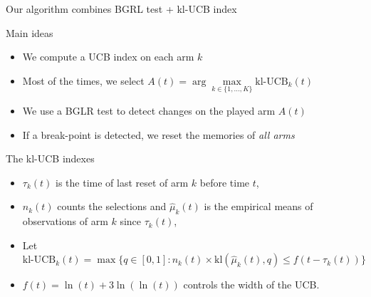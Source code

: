 \documentclass[11pt,french,ignorenonframetext,]{beamer}
\begin{document}
\begin{frame}{Our algorithm combines BGRL test + kl-UCB index}

  \begin{block}{Main ideas}
    \begin{itemize}
      \item We compute a UCB index on each arm $k$
      \item Most of the times, we select
      $A(t) = \arg\max\limits_{k\in \{1,\dots,K\}} \mbox{kl-UCB}_k(t)$
      \item We use a BGLR test \alert{to detect changes on the played arm $A(t)$}
      \item If a break-point is detected, \alert{we reset the memories of \emph{all arms}}
    \end{itemize}
  \end{block}

  \pause

  \begin{exampleblock}{The kl-UCB indexes}
    \begin{itemize}
      \item $\tau_k(t)$ is the time of last reset of arm $k$ before time $t$,
      \item $n_k(t)$ counts the selections and $\widehat{\mu}_k(t)$ is the empirical means of observations of arm $k$ since $\tau_k(t)$,
      \item Let {\small $\mbox{kl-UCB}_k(t) = \max \bigl\{ q\in[0,1] : n_k(t) \times \mathrm{kl}\left(\widehat{\mu}_k(t),q\right) \leq f(t - \tau_k(t)) \bigr\}$ }
      \item $f(t) = \ln(t) + 3 \ln(\ln(t))$ controls the width of the UCB.
    \end{itemize}
  \end{exampleblock}

\end{frame}
\end{document}
